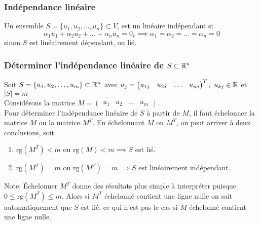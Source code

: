 \subsubsection{Indépendance linéaire}
\begin{definition}
      Un ensemble $S = \{ u_1, u_2, \ldots, u_n \} \subset V$, est un linéaire indépendant si
      \[
            \alpha_1 u_1 + \alpha_2 u_2 + \ldots + \alpha_n u_n = 0_v \implies \alpha_1 = \alpha_2 = \ldots = \alpha_n = 0
      \]
      sinon $S$ est linéairement dépendant, ou lié.
\end{definition}

\subsubsection{Déterminer l'indépendance linéaire de \texorpdfstring{$S \subset \mathbb{R}^n$}{S subset of Rn}}
Soit $S = \{ u_1, u_2, \ldots, u_m \} \subset \mathbb{R}^n$ avec $u_j = \begin{pmatrix}
            u_{1j} & u_{2j} & \dots  & u_{nj} \end{pmatrix}^T, \ u_{kj} \in \mathbb{R}$ et $|S| = m$ \\
Considérons la matrice $M = \begin{pmatrix} u_1 & u_2 & \ldots & u_m \end{pmatrix}$. \\
Pour déterminer l'indépendance linéaire de $S$ à partir de $M$, il faut
échelonner la matrice $M$ ou la matrice $M^T$. En échelonnant $M$ ou $M^T$, on peut arriver
à deux conclusions, soit \begin{enumerate}[1.]
      \item $\text{rg}(M^T) < m$ ou $\text{rg}(M) < m \implies S$ est lié.
      \item $\text{rg}(M^T) = m$ ou $\text{rg}(M^T) = m \implies S$ est linéairement indépendant.
\end{enumerate}
Note: Échelonner $M^T$ donne des résultats plus simple à interpréter puisque
$0 \leq \text{rg}(M^T) \leq m$. Alors si $M^T$ échelonné contient une ligne nulle
on sait automatiquement que $S$ est lié, ce qui n'est pas le cas si $M$ échelonné
contient une ligne nulle.

